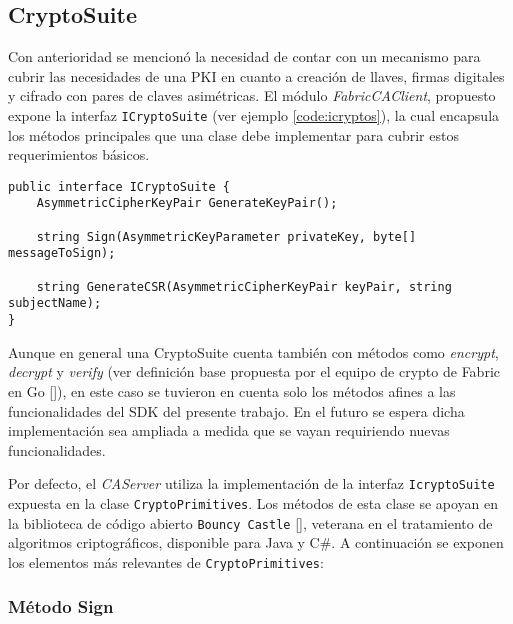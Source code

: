 \subsection{CryptoSuite}\label{subchapter:cryptoEp}

Con anterioridad se mencion\'o la necesidad de contar con un mecanismo para cubrir las necesidades de una PKI en cuanto a creaci\'on de llaves, firmas digitales y cifrado con pares de claves asimétricas. El m\'odulo \emph{FabricCAClient}, propuesto expone la interfaz \texttt{ICryptoSuite} (ver ejemplo \ref{code:icryptos}), la cual encapsula los m\'etodos principales que una clase debe implementar para cubrir estos requerimientos b\'asicos. 

\begin{lstlisting}[caption={Interfaz \texttt{ICryptoSuite}.}, label={code:icryptos}]
public interface ICryptoSuite {
	AsymmetricCipherKeyPair GenerateKeyPair();
	
	string Sign(AsymmetricKeyParameter privateKey, byte[] messageToSign);
	
	string GenerateCSR(AsymmetricCipherKeyPair keyPair, string subjectName);
}
\end{lstlisting}

Aunque en general una CryptoSuite cuenta tambi\'en con m\'etodos como \emph{encrypt}, \emph{decrypt} y \emph{verify} (ver definici\'on base propuesta por el equipo de crypto de Fabric en Go [\cite{bccsp}]), en este caso se tuvieron en cuenta solo los m\'etodos afines a las funcionalidades del SDK del presente trabajo. En el futuro se espera dicha implementaci\'on sea ampliada a medida que se vayan requiriendo nuevas funcionalidades.

Por defecto, el \emph{CAServer} utiliza la implementaci\'on de la interfaz \texttt{IcryptoSuite} expuesta en la clase \texttt{CryptoPrimitives}. Los m\'etodos de esta clase se apoyan en la biblioteca de código abierto \texttt{Bouncy Castle} [\cite{bouncycastle}], veterana en el tratamiento de algoritmos criptogr\'aficos, disponible para Java y C\#. A continuaci\'on se exponen los elementos m\'as relevantes de \texttt{CryptoPrimitives}:

\subsubsection{M\'etodo Sign}

